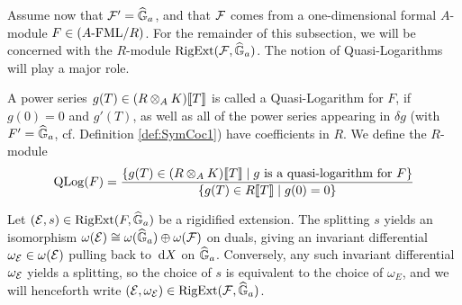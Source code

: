 \documentclass[../main.tex]{subfiles}
\begin{document}
Assume now that $\mathcal{F}' = \widehat{\mathbb{G}}_a$, and that 
$\mathcal{F}$ comes from a one-dimensional formal $A$-module $F \in {({A}\text-\mathrm{FML}/{R})}$. For
the remainder of this subsection, we will be concerned with the $R$-module
$\operatorname {RigExt}(\mathcal{F}, \widehat{\mathbb{G}}_a)$. The notion of Quasi-Logarithms will play a major role.

\begin{defi}\label{def:QuasiLogarithm}
  A power series $g(T) \in (R \otimes_A K) \llbracket T \rrbracket$ is called a 
  Quasi-Logarithm for $F$, if $g(0) = 0$ and $g'(T)$, as well as all 
  of the power series appearing in $\delta g$ (with $F' = \widehat{\mathbb{G}}_a$, cf.
  Definition \ref{def:SymCoc1})
  have coefficients in $R$. We define the $R$-module
  \begin{equation*}
    \operatorname {QLog}(F) = \frac{\{g(T) \in (R \otimes_A K) \llbracket T \rrbracket \mid g \text{ is a 
    quasi-logarithm for } F\}}{\{g(T) \in R\llbracket T \rrbracket \mid g(0) = 0\}}
  \end{equation*}
\end{defi}

Let $(\mathcal{E},s) \in \operatorname {RigExt}(F,\widehat{\mathbb{G}}_a)$ be a rigidified extension. 
The splitting $s$ yields an isomorphism $\omega(\mathcal{E}) \cong \omega(\widehat{\mathbb{G}}_a) \oplus
\omega(\mathcal{F})$ on duals, giving an invariant differential $\omega_{\mathcal{E}} \in
\omega(\mathcal{E})$ pulling back to $\, \mathrm{d} X$ on $\widehat{\mathbb{G}}_a$. Conversely, any such invariant
differential $\omega_{\mathcal{E}}$ yields a splitting, so the choice of $s$ is
equivalent to the choice of $\omega_E$, and we will henceforth write 
$(\mathcal{E}, \omega_{\mathcal{E}}) \in \operatorname {RigExt}(\mathcal{F}, \widehat{\mathbb{G}}_a)$. 
\end{document}
